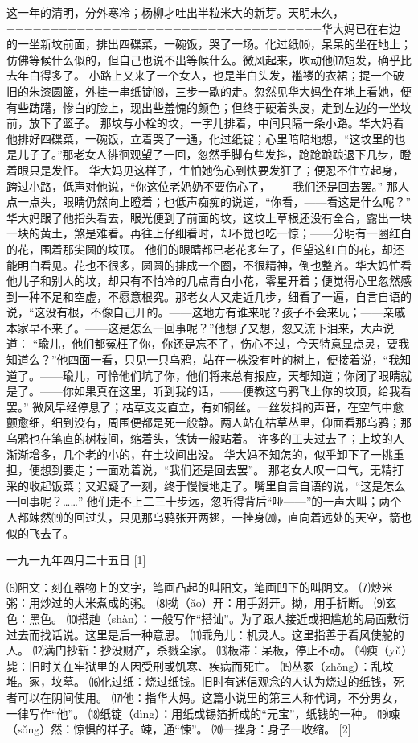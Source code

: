 \documentclass[12pt,UTF8]{ctexbook}
\begin{document}
这一年的清明，分外寒冷；杨柳才吐出半粒米大的新芽。天明未久，====================================华大妈已在右边的一坐新坟前面，排出四碟菜，一碗饭，哭了一场。化过纸⒃，呆呆的坐在地上；仿佛等候什么似的，但自己也说不出等候什么。微风起来，吹动他⒄短发，确乎比去年白得多了。
小路上又来了一个女人，也是半白头发，褴褛的衣裙；提一个破旧的朱漆圆篮，外挂一串纸锭⒅，三步一歇的走。忽然见华大妈坐在地上看她，便有些踌躇，惨白的脸上，现出些羞愧的颜色；但终于硬着头皮，走到左边的一坐坟前，放下了篮子。
那坟与小栓的坟，一字儿排着，中间只隔一条小路。华大妈看他排好四碟菜，一碗饭，立着哭了一通，化过纸锭；心里暗暗地想，“这坟里的也是儿子了。”那老女人徘徊观望了一回，忽然手脚有些发抖，跄跄踉踉退下几步，瞪着眼只是发怔。
华大妈见这样子，生怕她伤心到快要发狂了；便忍不住立起身，跨过小路，低声对他说，“你这位老奶奶不要伤心了，——我们还是回去罢。”
那人点一点头，眼睛仍然向上瞪着；也低声痴痴的说道，“你看，——看这是什么呢？”
华大妈跟了他指头看去，眼光便到了前面的坟，这坟上草根还没有全合，露出一块一块的黄土，煞是难看。再往上仔细看时，却不觉也吃一惊；——分明有一圈红白的花，围着那尖圆的坟顶。
他们的眼睛都已老花多年了，但望这红白的花，却还能明白看见。花也不很多，圆圆的排成一个圈，不很精神，倒也整齐。华大妈忙看他儿子和别人的坟，却只有不怕冷的几点青白小花，零星开着；便觉得心里忽然感到一种不足和空虚，不愿意根究。那老女人又走近几步，细看了一遍，自言自语的说，“这没有根，不像自己开的。——这地方有谁来呢？孩子不会来玩；——亲戚本家早不来了。——这是怎么一回事呢？”他想了又想，忽又流下泪来，大声说道：
“瑜儿，他们都冤枉了你，你还是忘不了，伤心不过，今天特意显点灵，要我知道么？”他四面一看，只见一只乌鸦，站在一株没有叶的树上，便接着说，“我知道了。——瑜儿，可怜他们坑了你，他们将来总有报应，天都知道；你闭了眼睛就是了。——你如果真在这里，听到我的话，——便教这乌鸦飞上你的坟顶，给我看罢。”
微风早经停息了；枯草支支直立，有如铜丝。一丝发抖的声音，在空气中愈颤愈细，细到没有，周围便都是死一般静。两人站在枯草丛里，仰面看那乌鸦；那乌鸦也在笔直的树枝间，缩着头，铁铸一般站着。
许多的工夫过去了；上坟的人渐渐增多，几个老的小的，在土坟间出没。
华大妈不知怎的，似乎卸下了一挑重担，便想到要走；一面劝着说，“我们还是回去罢”。
那老女人叹一口气，无精打采的收起饭菜；又迟疑了一刻，终于慢慢地走了。嘴里自言自语的说，“这是怎么一回事呢？……”
他们走不上二三十步远，忽听得背后“哑——”的一声大叫；两个人都竦然⒆的回过头，只见那乌鸦张开两翅，一挫身⒇，直向着远处的天空，箭也似的飞去了。

一九一九年四月二十五日 [1]


⑹阳文：刻在器物上的文字，笔画凸起的叫阳文，笔画凹下的叫阴文。
⑺炒米粥：用炒过的大米煮成的粥。
⑻拗（ǎo）开：用手掰开。拗，用手折断。
⑼玄色：黑色。
⑽搭赸（shàn）：一般写作“搭讪”。为了跟人接近或把尴尬的局面敷衍过去而找话说。这里是后一种意思。
⑾乖角儿：机灵人。这里指善于看风使舵的人。
⑿满门抄斩：抄没财产，杀戮全家。
⒀板滞：呆板，停止不动。
⒁瘐（yǔ）毙：旧时关在牢狱里的人因受刑或饥寒、疾病而死亡。
⒂丛冢（zhǒng）：乱坟堆。冢，坟墓。
⒃化过纸：烧过纸钱。旧时有迷信观念的人认为烧过的纸钱，死者可以在阴间使用。
⒄他：指华大妈。这篇小说里的第三人称代词，不分男女，一律写作“他”。
⒅纸锭（dìng）：用纸或锡箔折成的“元宝”，纸钱的一种。
⒆竦（sǒng）然：惊惧的样子。竦，通“悚”。
⒇一挫身：身子一收缩。 [2]
\end{document}

